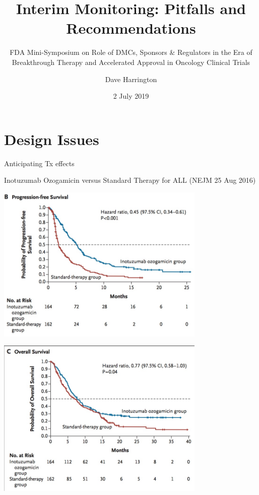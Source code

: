 \documentclass[ignorenonframetext,]{beamer}
\title{Interim Monitoring: Pitfalls and Recommendations}
\subtitle{FDA Mini-Symposium on Role of DMCs, Sponsors \& Regulators in the Era of
Breakthrough Therapy and Accelerated Approval in Oncology Clinical
Trials}
\author{Dave Harrington}
\date{2 July 2019}
\begin{document}
\frame{\titlepage}

\hypertarget{design-issues}{%
\section{Design Issues}\label{design-issues}}

\begin{frame}{%
\protect\hypertarget{anticipating-tx-effects}{%
Anticipating Tx effects}}

Inotuzumab Ozogamicin versus Standard Therapy for ALL (NEJM 25 Aug 2016)

\includegraphics[width=0.75\textwidth,height=\textheight]{./figures/pfs_all.jpeg}

\end{frame}

\begin{frame}{%
\protect\hypertarget{section}{%
}}

\includegraphics[width=0.75\textwidth,height=\textheight]{./figures/os_all.jpeg}

\end{frame}
\end{document}
